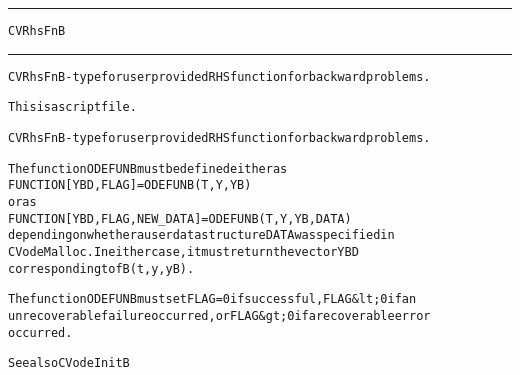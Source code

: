 \begin{samepage}
\hrule
\begin{center}
{\large \verb!CVRhsFnB!}
\label{p:CVRhsFnB}
\end{center}
\hrule\vspace{0.1in}



\begin{alltt}
CVRhsFnB - type for user provided RHS function for backward problems.
\end{alltt}

\end{samepage}



\begin{samepage}


\begin{alltt}
This is a script file. 
\end{alltt}

\end{samepage}



\begin{alltt}
CVRhsFnB - type for user provided RHS function for backward problems.

   The function ODEFUNB must be defined either as
        FUNCTION [YBD, FLAG] = ODEFUNB(T,Y,YB)
   or as
        FUNCTION [YBD, FLAG, NEW_DATA] = ODEFUNB(T,Y,YB,DATA)
   depending on whether a user data structure DATA was specified in
   CVodeMalloc. In either case, it must return the vector YBD
   corresponding to fB(t,y,yB).

   The function ODEFUNB must set FLAG=0 if successful, FLAG&lt;0 if an
   unrecoverable failure occurred, or FLAG&gt;0 if a recoverable error
   occurred.

   See also CVodeInitB
\end{alltt}






\vspace{0.1in}